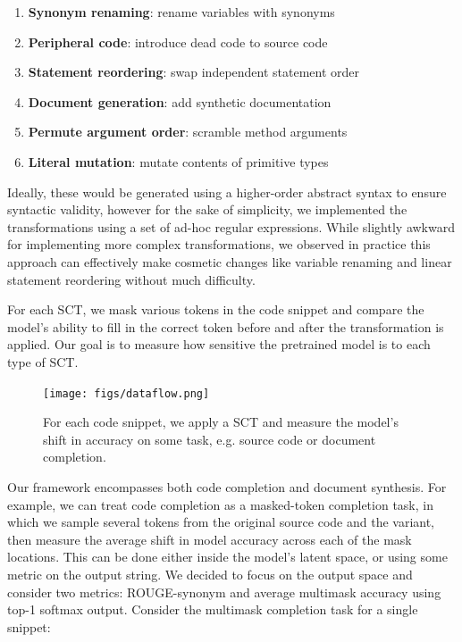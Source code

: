\documentclass[sigconf,review,anonymous]{acmart}
\begin{document}
  \begin{enumerate}
    \item \textbf{Synonym renaming}: rename variables with synonyms
    \item \textbf{Peripheral code}: introduce dead code to source code
    \item \textbf{Statement reordering}: swap independent statement order
    \item \textbf{Document generation}: add synthetic documentation
    \item \textbf{Permute argument order}: scramble method arguments
    \item \textbf{Literal mutation}: mutate contents of primitive types
  \end{enumerate}

  Ideally, these would be generated using a higher-order abstract syntax to ensure syntactic validity, however for the sake of simplicity, we implemented the transformations using a set of ad-hoc regular expressions. While slightly awkward for implementing more complex transformations, we observed in practice this approach can effectively make cosmetic changes like variable renaming and linear statement reordering without much difficulty.

  For each SCT, we mask various tokens in the code snippet and compare the model's ability to fill in the correct token before and after the transformation is applied. Our goal is to measure how sensitive the pretrained model is to each type of SCT.

  \begin{figure}[H]
    \centering
    \texttt{[image: figs/dataflow.png]}
    \caption{For each code snippet, we apply a SCT and measure the model's shift in accuracy on some task, e.g. source code or document completion.}
    \label{fig:dataflow}
  \end{figure}

  Our framework encompasses both code completion and document synthesis. For example, we can treat code completion as a masked-token completion task, in which we sample several tokens from the original source code and the variant, then measure the average shift in model accuracy across each of the mask locations. This can be done either inside the model's latent space, or using some metric on the output string. We decided to focus on the output space and consider two metrics: ROUGE-synonym and average multimask accuracy using top-1 softmax output. Consider the multimask completion task for a single snippet:
\end{document}
